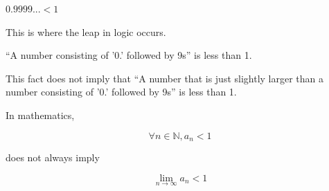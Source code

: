 \begin{frame}[c]{}{}
  $0.9999... < 1$

  \vspace{2ex}

  This is where the leap in logic occurs.

  \vspace{2ex}

  ``A number consisting of '0.' followed by 9s'' is less than 1.

  This fact does not imply that ``A number that is just slightly larger than a number consisting of '0.' followed by 9s'' is less than 1.
\end{frame}

\begin{frame}[c]{}{}
  In mathematics,

  \vspace{2ex}

  $$\forall n \in \mathbb{N}, a_n < 1$$

  \vspace{2ex}

  does not always imply

  \vspace{2ex}

  $$\lim_{n \to \infty} a_n < 1$$
\end{frame}
